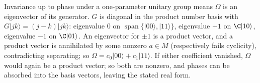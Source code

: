 Invariance up to phase under a one-parameter unitary group means $\Omega$ is an eigenvector of its generator. $G$ is diagonal in the product number basis with $G|jk\rangle = (j - k)|jk\rangle$: eigenvalue $0$ on $\operatorname{span}\{|00\rangle, |11\rangle\}$, eigenvalue $+1$ on $\C|10\rangle$, eigenvalue $-1$ on $\C|01\rangle$. An eigenvector for $\pm 1$ is a product vector, and a product vector is annihilated by some nonzero $a \in M$ (respectively fails cyclicity), contradicting separating; so $\Omega = c_0|00\rangle + c_1|11\rangle$. If either coefficient vanished, $\Omega$ would again be a product vector; so both are nonzero, and phases can be absorbed into the basis vectors, leaving the stated real form.
